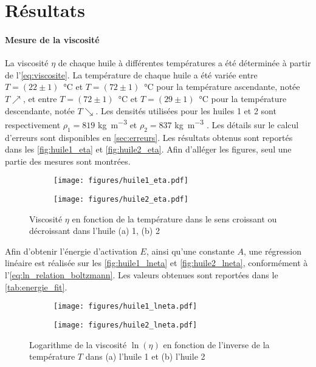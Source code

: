 \section{Résultats}

\paragraph{Mesure de la viscosité} La viscosité \(\eta\) de chaque huile à différentes températures a été déterminée à partir de l'\autoref{eq:viscosite}. La température de chaque huile a été variée entre \mbox{\(T=(22 \pm 1)\) \si{\celsius}} et \mbox{\(T=(72 \pm 1)\) \si{\celsius}} pour la température ascendante, notée \(T\nearrow\), et entre \mbox{\(T=(72 \pm 1)\) \si{\celsius}} et \mbox{\(T=(29 \pm 1)\) \si{\celsius}} pour la température descendante, notée \(T\searrow\). Les densités utilisées pour les huiles 1 et 2 sont respectivement \(\rho_1 = 819\) \si{\kilo\gram\per\cubic\meter} et \(\rho_2 = 837\) \si{\kilo\gram\per\cubic\meter} \cite{val_ref}. Les détails sur le calcul d'erreurs sont disponibles en \autoref{sec:erreurs}. Les résultats obtenus sont reportés dans les \autoref{fig:huile1_eta} et \autoref{fig:huile2_eta}. Afin d'alléger les figures, seul une partie des mesures sont montrées.

\begin{figure}[h]
    \centering
    \begin{subfigure}{0.48\linewidth}
        \centering
        \texttt{[image: figures/huile1\_eta.pdf]}
        \caption{}
        \label{fig:huile1_eta}
    \end{subfigure}
    \begin{subfigure}{0.48\linewidth}
        \centering
        \texttt{[image: figures/huile2\_eta.pdf]}
        \caption{}
        \label{fig:huile2_eta}
    \end{subfigure}
    \caption{Viscosité \(\eta\) en fonction de la température dans le sens croissant ou décroissant dans l'huile (a) 1, (b) 2}
\end{figure}

Afin d'obtenir l'énergie d'activation \(E\), ainsi qu'une constante \(A\), une régression linéaire est réalisée sur les \autoref{fig:huile1_lneta} et \autoref{fig:huile2_lneta}, conformément à l'\autoref{eq:ln_relation_boltzmann}. Les valeurs obtenues sont reportées dans le \autoref{tab:energie_fit}.

\begin{figure}[h]
    \centering
    \begin{subfigure}{0.48\linewidth}
        \centering
        \texttt{[image: figures/huile1\_lneta.pdf]}
        \caption{}
        \label{fig:huile1_lneta}
    \end{subfigure}
    \begin{subfigure}{0.48\linewidth}
        \centering
        \texttt{[image: figures/huile2\_lneta.pdf]}
        \caption{}
        \label{fig:huile2_lneta}
    \end{subfigure}
    \caption{Logarithme de la viscosité \(\ln(\eta)\) en fonction de l'inverse de la température \(T\) dans (a) l'huile 1 et (b) l'huile 2}
\end{figure}


